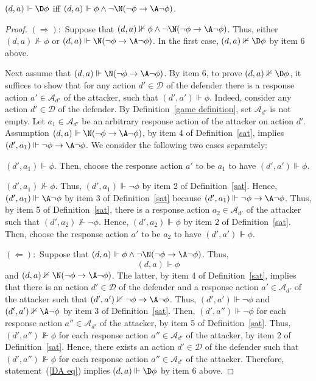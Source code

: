 \documentclass[letterpaper]{article}
\begin{document}
\begin{lemma}\label{D through A lemma}
$(d,a)\Vdash \D\phi$ iff  $(d,a)\Vdash \phi\wedge \neg\N(\neg\phi\to\A\neg\phi)$.
\end{lemma}
\begin{proof}
$(\Rightarrow):$ Suppose that $(d,a)\nVdash \phi\wedge \neg\N(\neg\phi\to\A\neg\phi)$. Thus, either $(d,a)\nVdash \phi$ or $(d,a) \Vdash\N(\neg\phi\to\A\neg\phi)$. In the first case, $(d,a)\nVdash\D\phi$ by item 6 above.

Next assume that $(d,a) \Vdash\N(\neg\phi\to\A\neg\phi)$. By item 6, to prove $(d,a)\nVdash \D\phi$, it suffices to show that for any action $d'\in\mathcal{D}$ of the defender there is a response action $a'\in\mathcal{A}_{d'}$ of the attacker, such that $(d',a')\Vdash\phi$. Indeed, consider any action $d'\in\mathcal{D}$ of the defender. By Definition~\ref{game definition}, set $\mathcal{A}_{d'}$ is not empty. Let $a_1\in \mathcal{A}_{d'}$ be an arbitrary response action of the attacker  on action $d'$. Assumption $(d,a) \Vdash\N(\neg\phi\to\A\neg\phi)$, by item 4 of Definition~\ref{sat}, implies $(d',a_1)\Vdash\neg\phi\to\A\neg\phi$. We consider the following two cases separately:

 $(d',a_1)\Vdash\phi$. Then, choose the response action $a'$ to be $a_1$ to have $(d',a')\Vdash\phi$.

 $(d',a_1)\nVdash\phi$. Thus, $(d',a_1)\Vdash\neg\phi$ by item 2 of Definition~\ref{sat}. Hence, $(d',a_1)\Vdash\A\neg\phi$ by item 3 of Definition~\ref{sat} because $(d',a_1)\Vdash\neg\phi\to\A\neg\phi$. Thus, by item 5 of Definition~\ref{sat}, there is a response action $a_2\in\mathcal{A}_{d'}$ of the attacker such that $(d',a_2)\nVdash\neg\phi$. Hence, $(d',a_2)\Vdash\phi$ by item 2 of Definition~\ref{sat}. Then, choose the response action $a'$ to be $a_2$ to have $(d',a')\Vdash\phi$.

\noindent$(\Leftarrow):$ Suppose that $(d,a) \Vdash \phi\wedge \neg\N(\neg\phi\to\A\neg\phi)$. Thus,
\begin{equation}\label{DA eq}
    (d,a) \Vdash \phi
\end{equation}
and  $(d,a) \nVdash\N(\neg\phi\to\A\neg\phi)$. The latter, by item 4 of Definition~\ref{sat}, implies that there is an action $d'\in\mathcal{D}$ of the defender and a response action $a'\in\mathcal{A}_{d'}$ of the attacker such that $(d',a') \nVdash\neg\phi\to\A\neg\phi$. Thus, $(d',a') \Vdash\neg\phi$ and $(d',a') \nVdash\A\neg\phi$ by item 3 of Definition~\ref{sat}. Then, $(d',a'') \Vdash\neg\phi$ for each response action $a''\in\mathcal{A}_{d'}$ of the attacker, by item 5 of Definition~\ref{sat}.
Thus, $(d',a'') \nVdash\phi$ for each response action $a''\in\mathcal{A}_{d'}$ of the attacker, by item 2 of Definition~\ref{sat}.
Hence, there exists an action $d'\in\mathcal{D}$ of the defender such that $(d',a'') \nVdash\phi$ for each response action $a''\in\mathcal{A}_{d'}$ of the attacker.
Therefore, statement~(\ref{DA eq}) implies $(d,a) \Vdash \D\phi$ by item 6 above.
\end{proof}
\end{document}
